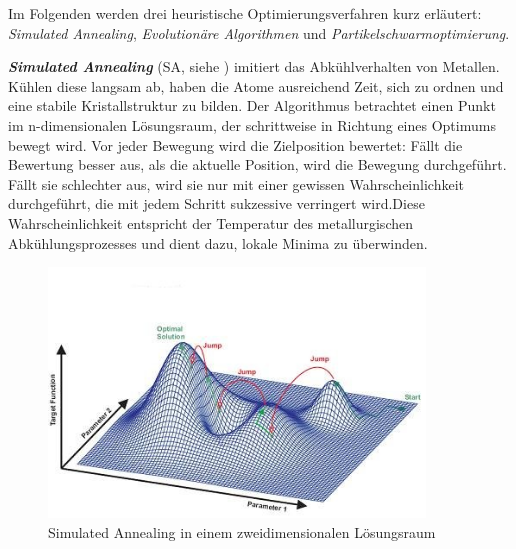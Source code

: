 Im Folgenden werden drei heuristische Optimierungsverfahren kurz erl\"autert: \textit{Simulated Annealing}, \textit{Evolution\"are Algorithmen} und \textit{Partikelschwarmoptimierung}. 

\textbf{\textit{Simulated Annealing}} (SA, siehe \cite{Kirkpatrik}) imitiert das Abkühlverhalten von Metallen. Kühlen diese langsam ab, haben die Atome ausreichend Zeit, sich zu ordnen und eine stabile Kristallstruktur zu bilden. Der Algorithmus betrachtet einen Punkt im n-dimensionalen L\"osungsraum, der schrittweise in Richtung eines Optimums bewegt wird. Vor jeder Bewegung wird die Zielposition bewertet: Fällt die Bewertung besser aus, als die aktuelle Position, wird die Bewegung durchgeführt. Fällt sie schlechter aus, wird sie nur mit einer gewissen Wahrscheinlichkeit durchgef\"uhrt, die mit jedem Schritt sukzessive verringert wird.Diese Wahrscheinlichkeit entspricht der Temperatur des metallurgischen Abkühlungsprozesses und dient dazu, lokale Minima zu \"uberwinden.

\begin{figure}[ht]
\centering
\includegraphics[width=10cm]{graphics/SimAnn.jpg}
\caption{Simulated Annealing in einem zweidimensionalen L\"osungsraum}
\label{fig6}
\end{figure}

